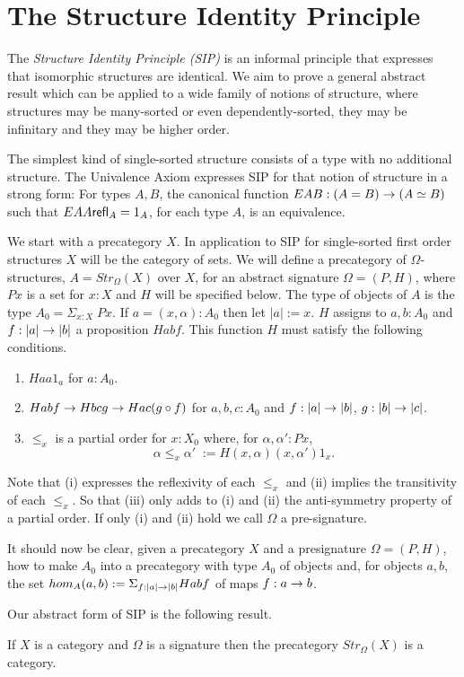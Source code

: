 \newpage

\section{The Structure Identity Principle}
\label{sec:sip}
The {\em Structure Identity Principle (SIP)} is an informal principle
that expresses that isomorphic structures are identical.  We aim to
prove a general abstract result which can be applied to a wide family
of notions of structure, where structures may be many-sorted or even
dependently-sorted, they may be infinitary and they may be higher
order.  

The simplest kind of single-sorted structure consists of a type with
no additional structure.  The Univalence Axiom expresses SIP for that
notion of structure in a strong form: For types $A,B$, the
canonical function $EAB: (A=B)\rightarrow (A\simeq B)$ such that
$EAA\mathsf{refl}_{A}=1_A$, for each type $A$, is an equivalence.

We start with a precategory $X$.  In application to SIP for
single-sorted first order structures $X$ will be the category of sets.
We will define a precategory of $\Omega$-structures, $A =
Str_\Omega(X)$ over $X$, for an abstract signature $\Omega = (P,H)$,
where $Px$ is a set for $x:X$ and $H$ will be specified below.  The
type of objects of $A$ is the type $A_0 = \Sigma_{x:X}\; Px$.  If
$a=(x,\alpha):A_0$ then let $|a| := x$.  $H$ assigns to $a,b:A_0$ and
$f:|a|\rightarrow |b|$ a proposition $Habf$.  This function $H$ must satisfy
the following conditions.
\begin{enumerate}
\item $Haa1_a$ for $a:A_0$.
\item $Habf\rightarrow Hbcg\rightarrow Hac(g\circ f)$ for $a,b,c:A_0$ and $f:|a|\rightarrow |b|$, $g:|b|\rightarrow |c|$.
\item $\leq_x$ is a partial order for $x:X_0$ where, for $\alpha,\alpha':Px$, 
  \[ \alpha\leq_x\alpha'\;  := H(x,\alpha)(x,\alpha')1_x.\]
\end{enumerate}
Note that (i) expresses the reflexivity of each $\leq_x$ and (ii)
implies the transitivity of each $\leq_x$.  So that (iii) only adds to
(i) and (ii) the anti-symmetry property of a partial order.  If only
(i) and (ii) hold we call $\Omega$ a pre-signature.

It should now be clear, given a precategory $X$ and a presignature
$\Omega =(P,H)$, how to make $A_0$ into a precategory with type $A_0$
of objects and, for objects $a,b$, the set $hom_A(a,b) :=
\Sigma_{f:|a|\rightarrow |b|}Habf$ of maps $f:a\rightarrow b$.

Our abstract form of SIP is the following result.
\begin{thm} \label{thm:sip}
If $X$ is a category and $\Omega$ is a signature then the precategory 
$Str_\Omega(X)$ is a category.
\end{thm}
